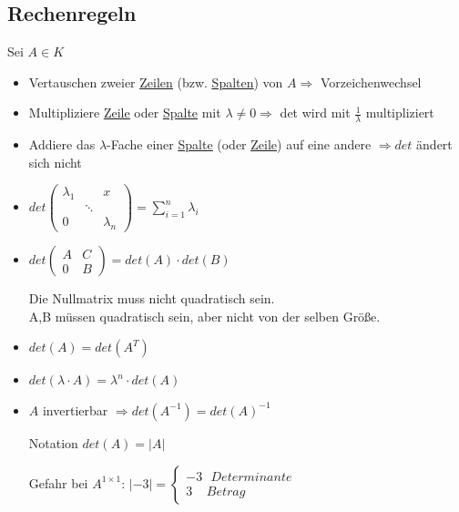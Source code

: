 \documentclass{scrartcl}
\newcommand{\linkToRef}[2][ref]{\hyperref[#1]{\underline{#2}}}
\begin{document}
    \subsection{Rechenregeln}
    \label{Rechenregeln Determinanten}
        Sei $A \in K$
        \begin{Def}
        \begin{itemize}
        \setlength\itemsep{-0.25em}
        \item Vertauschen zweier \linkToRef[Zeilenvektor]{Zeilen} (bzw. \linkToRef[Zeilenvektor]{Spalten}) von $A \Rightarrow$ Vorzeichenwechsel
        \item Multipliziere \linkToRef[Zeilenvektor]{Zeile} oder \linkToRef[Zeilenvektor]{Spalte} mit $\lambda \neq 0 \Rightarrow$ det wird mit $\frac{1}{\lambda}$ multipliziert
        \item Addiere das $\lambda$-Fache einer \linkToRef[Zeilenvektor]{Spalte} (oder \linkToRef[Zeilenvektor]{Zeile}) auf eine andere $\Rightarrow det$ ändert sich nicht
        \item $det\begin{pmatrix} \lambda_1 & & x \\ & \ddots & \\ 0 & & \lambda_n \end{pmatrix} = \sum_{i = 1}^{n} \lambda_i$
        \item $det\left(\begin{array}{c|c} A & C \\ \hline 0 & B \end{array}\right) = det(A) \cdot det(B)$
        \begin{Notiz}
        Die Nullmatrix muss nicht quadratisch sein.\\
        A,B müssen quadratisch sein, aber nicht von der selben Größe.
        \end{Notiz}
        \item $det(A) = det(A^T)$
        \item $det(\lambda \cdot A) = \lambda^n \cdot det(A)$
        \item $A$ invertierbar $\Rightarrow det(A^{-1}) = det(A)^{-1}$
        \begin{Notiz}
        Notation $det(A) = |A|$
        \begin{Warnung}
        Gefahr bei $A^{1 \times 1}$: $|-3| = \begin{cases}
               -3 ~~~ Determinante\\
               3 ~~~~~ Betrag
            \end{cases}$
        \end{Warnung}
        \end{Notiz}
        \end{itemize}
        \end{Def}
        
\end{document}
